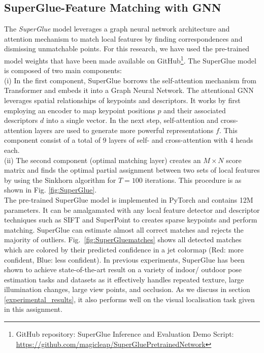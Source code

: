 \documentclass[conference]{IEEEtran}
\begin{document}
\subsection{SuperGlue-Feature Matching with GNN}
The \textit{SuperGlue} model \cite{b12} leverages a
graph neural network architecture and attention mechanism to match local features by finding correspondences and dismissing unmatchable points. For this research, we have used the pre-trained model weights that have been made available on GitHub\footnote{GitHub repository: SuperGlue Inference and Evaluation Demo Script: \url{https://github.com/magicleap/SuperGluePretrainedNetwork}}. The SuperGlue model is composed of two main components:\\
(i) In the first component, SuperGlue borrows the
self-attention mechanism from Transformer and embeds it into a Graph Neural Network. The attentional GNN leverages spatial relationships of keypoints and descriptors. It works by first employing an encoder to map keypoint positions $p$ and their associated descriptors $d$ into a single vector. In the next step,  self-attention and cross-attention layers are used to generate more powerful representations $f$. This component consist of a total of 9 layers of self- and cross-attention with 4 heads each.\\
(ii) The second component (optimal matching layer) creates an $M \times N$ score matrix and finds the optimal partial assignment between two sets of local features by using the Sinkhorn algorithm for $T=100$ iterations. This procedure is as shown in Fig. \ref{fig:SuperGlue}.\\
The pre-trained SuperGlue model is implemented in PyTorch \cite{b4} and contains 12M parameters. It can be 
amalgamated with any local feature detector and descriptor techniques such as SIFT and SuperPoint to creates sparse keypoints and perform matching. SuperGlue can estimate almost all correct matches and rejects the majority of outliers. Fig.~\ref{fig:SuperGluematches} shows all detected matches which are colored by their predicted confidence in a jet colormap (Red: more confident, Blue: less confident).
In previous experiments, SuperGlue has been shown to achieve state-of-the-art result on a variety of indoor/ outdoor pose estimation tasks and datasets as it effectively handles repeated texture, large illumination changes, large view points, and occlusion. As we discuss in section \ref{experimental_results}, it also performs well on the visual localisation task given in this assignment. \\
\end{document}

